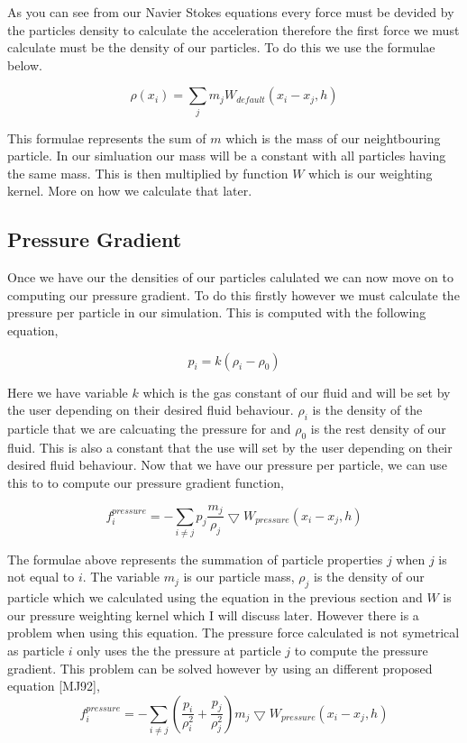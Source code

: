 As you can see from our Navier Stokes equations every force must be devided by the particles density to calculate the acceleration therefore the first force we must calculate must be the density of our particles. To do this we use the formulae below.\par
 \[ \rho(x_i)= \sum\limits_{j}m_j W_{default}(x_i-x_j,h) \]\par
 This formulae represents the sum of $m$ which is the mass of our neightbouring particle. In our simluation our mass will be a constant with all particles having the same mass. This is then multiplied by function $W$ which is our weighting kernel. More on how we calculate that later.

\subsection*{Pressure Gradient }

Once we have our the densities of our particles calulated we can now move on to computing our pressure gradient. To do this firstly however we must calculate the pressure per particle in our simulation. This is computed with the following equation,\par
 \[ p_i = k(\rho_i - \rho_0) \]\par
 Here we have variable $k$ which is the gas constant of our fluid and will be set by the user depending on their desired fluid behaviour. $\rho_i$ is the density of the particle that we are calcuating the pressure for and $\rho_0$ is the rest density of our fluid. This is also a constant that the use will set by the user depending on their desired fluid behaviour. Now that we have our pressure per particle, we can use this to to compute our pressure gradient function,\par
 \[ f_i^{pressure} = -\sum\limits_{i\neq j}p_j\frac{m_j}{\rho_j}\bigtriangledown W_{pressure}(x_i-x_j,h) \]\par
The formulae above represents the summation of particle properties $j$ when $j$ is not equal to $i$. The variable $m_j$ is our particle mass, $\rho_j$ is the density of our particle which we calculated using the equation in the previous section and $W$ is our pressure weighting kernel which I will discuss later. However there is a problem when using this equation. The pressure force calculated is not symetrical as particle $i$ only uses the the pressure at particle $j$ to compute the pressure gradient. This problem can be solved however by using an different proposed equation \mbox{[}M\-J92\mbox{]}, \[ f_i^{pressure} = -\sum\limits_{i\neq j}(\frac{p_i}{\rho_i^2} + \frac{p_j}{\rho_j^2})m_j\bigtriangledown W_{pressure}(x_i-x_j,h) \]

